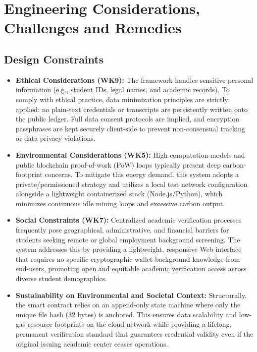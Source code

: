 \chapter{Engineering Considerations, Challenges and Remedies}

\section{Design Constraints}
\begin{itemize}
    \item \textbf{Ethical Considerations (WK9):} The framework handles sensitive personal information (e.g., student IDs, legal names, and academic records). To comply with ethical practice, data minimization principles are strictly applied: no plain-text credentials or transcripts are persistently written onto the public ledger. Full data consent protocols are implied, and encryption passphrases are kept securely client-side to prevent non-consensual tracking or data privacy violations.
    \item \textbf{Environmental Considerations (WK5):} High computation models and public blockchain proof-of-work (PoW) loops typically present deep carbon-footprint concerns. To mitigate this energy demand, this system adopts a private/permissioned strategy and utilizes a local test network configuration alongside a lightweight containerized stack (Node.js/Python), which minimizes continuous idle mining loops and excessive carbon output.
    \item \textbf{Social Constraints (WK7):} Centralized academic verification processes frequently pose geographical, administrative, and financial barriers for students seeking remote or global employment background screening. The system addresses this by providing a lightweight, responsive Web interface that requires no specific cryptographic wallet background knowledge from end-users, promoting open and equitable academic verification access across diverse student demographics.
    \item \textbf{Sustainability on Environmental and Societal Context:} Structurally, the smart contract relies on an append-only state machine where only the unique file hash (32 bytes) is anchored. This ensures data scalability and low-gas resource footprints on the cloud network while providing a lifelong, permanent verification standard that guarantees credential validity even if the original issuing academic center ceases operations.
\end{itemize}

